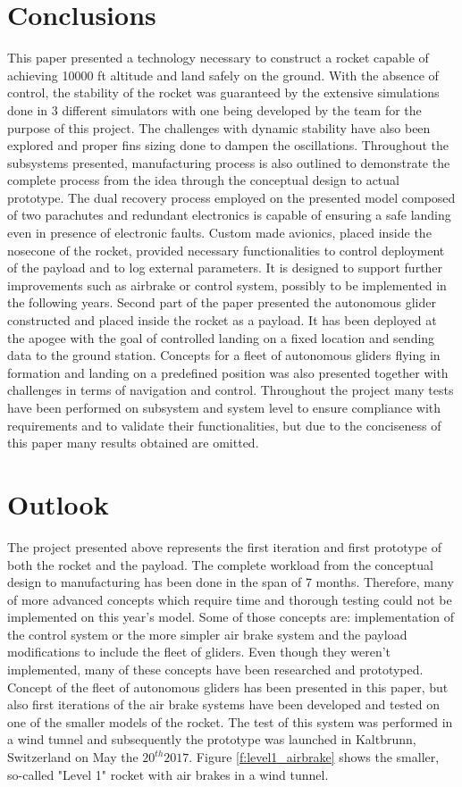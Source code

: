 \documentclass[]{iac}
\begin{document}
\section{Conclusions}
This paper presented a technology necessary to construct a rocket capable of achieving 10000 ft altitude and land safely on the ground. With the absence of control, the stability of the rocket was guaranteed by the extensive simulations done in 3 different simulators with one being developed by the team for the purpose of this project. The challenges with dynamic stability have also been explored and proper fins sizing done to dampen the oscillations. Throughout the subsystems presented, manufacturing process is also outlined to demonstrate the complete process from the idea through the conceptual design to actual prototype. 
The dual recovery process employed on the presented model composed of two parachutes and redundant electronics is capable of ensuring a safe landing even in presence of electronic faults. Custom made avionics, placed inside the nosecone of the rocket, provided necessary functionalities to control deployment of the payload and to log external parameters. It is designed to support further improvements such as airbrake or control system, possibly to be implemented in the following years. 
Second part of the paper presented the autonomous glider constructed and placed inside the rocket as a payload. It has been deployed at the apogee with the goal of controlled landing on a fixed location and sending data to the ground station. Concepts for a fleet of autonomous gliders flying in formation and landing on a predefined position was also presented together with challenges in terms of navigation and control. Throughout the project many tests have been performed on subsystem and system level to ensure compliance with requirements and to validate their functionalities, but due to the conciseness of this paper many results obtained are omitted. 

\section{Outlook}
The project presented above represents the first iteration and first prototype of both the rocket and the payload. The complete workload from the conceptual design to manufacturing has been done in the span of 7 months. Therefore, many of more advanced concepts which require time and thorough testing could not be implemented on this year's model. Some of those concepts are: implementation of the control system or the more simpler air brake system and the payload modifications to include the fleet of gliders. Even though they weren't implemented, many of these concepts have been researched and prototyped. Concept of the fleet of autonomous gliders has been presented in this paper, but also first iterations of the air brake systems have been developed and tested on one of the smaller models of the rocket. The test of this system was performed in a wind tunnel and subsequently the prototype was launched in Kaltbrunn, Switzerland on May the $20^{th} 2017$. Figure \ref{f:level1_airbrake} shows the smaller, so-called "Level 1" rocket with air brakes in a wind tunnel. 
\end{document}
